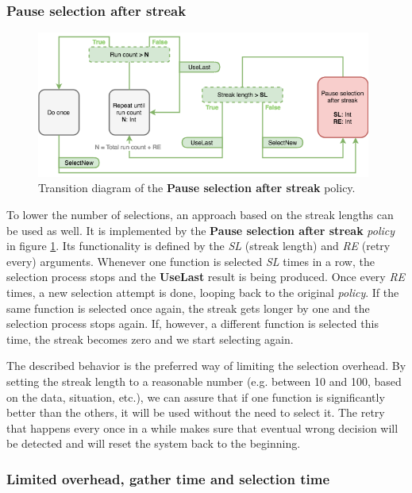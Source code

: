 \subsubsection{Pause selection after streak}

\begin{figure}[h!]
	\captionsetup{justification=centering,margin=0.5cm}
	\centerline{\mbox{\includegraphics[width=110mm]{./img/pause_selection_after_streak.png}}}
	\caption{Transition diagram of the \textbf{Pause selection after streak} policy.}
	\label{fig:pause_selection_after_streak}
\end{figure}

To lower the number of selections, an approach based on the streak lengths can be used as well. It is implemented by the \textbf{Pause selection after streak} \textit{policy} in figure \ref{fig:pause_selection_after_streak}. Its functionality is defined by the \textit{SL} (streak length) and \textit{RE} (retry every) arguments. Whenever one function is selected \textit{SL} times in a row, the selection process stops and the \textbf{UseLast} result is being produced. Once every \textit{RE} times, a new selection attempt is done, looping back to the original \textit{policy}. If the same function is selected once again, the streak gets longer by one and the selection process stops again. If, however, a different function is selected this time, the streak becomes zero and we start selecting again.

The described behavior is the preferred way of limiting the selection overhead. By setting the streak length to a reasonable number (e.g. between 10 and 100, based on the data, situation, etc.), we can assure that if one function is significantly better than the others, it will be used without the need to select it. The retry that happens every once in a while makes sure that eventual wrong decision will be detected and will reset the system back to the beginning.

\subsubsection{Limited overhead, gather time and selection time}

